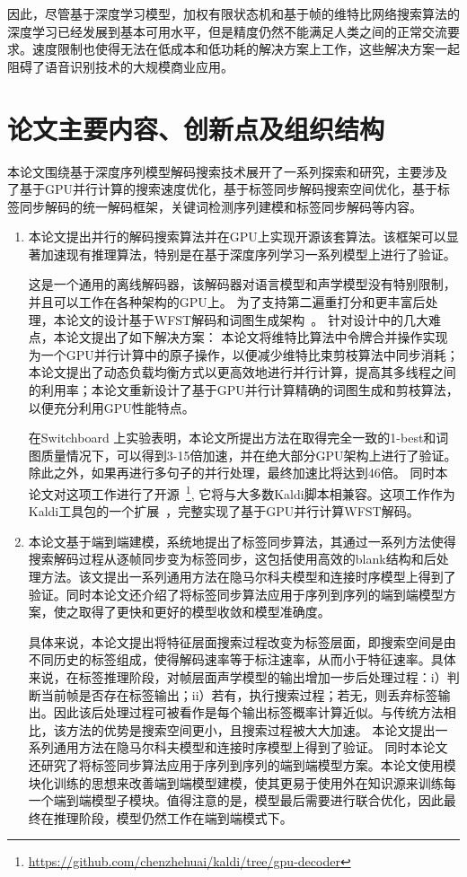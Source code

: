 因此，尽管基于深度学习模型，加权有限状态机和基于帧的维特比网络搜索算法的深度学习已经发展到基本可用水平，但是精度仍然不能满足人类之间的正常交流要求。速度限制也使得无法在低成本和低功耗的解决方案上工作，这些解决方案一起阻碍了语音识别技术的大规模商业应用。


\section{论文主要内容、创新点及组织结构}
\label{chap:intro0-thesis}
本论文围绕基于深度序列模型解码搜索技术展开了一系列探索和研究，主要涉及
了基于GPU并行计算的搜索速度优化，基于标签同步解码搜索空间优化，基于标签同步解码的统一解码框架，关键词检测序列建模和标签同步解码等内容。

\begin{enumerate}
    \item 
本论文提出并行的解码搜索算法并在GPU上实现开源该套算法。该框架可以显著加速现有推理算法，特别是在基于深度序列学习一系列模型上进行了验证。

这是一个通用的离线解码器，该解码器对语言模型和声学模型没有特别限制，并且可以工作在各种架构的GPU上。
为了支持第二遍重打分和更丰富后处理，本论文的设计基于WFST解码和词图生成架构~\cite{povey2012generating}。
针对设计中的几大难点，本论文提出了如下解决方案：
本论文将维特比算法中令牌合并操作实现为一个GPU并行计算中的原子操作，以便减少维特比束剪枝算法中同步消耗；本论文提出了动态负载均衡方式以更高效地进行并行计算，提高其多线程之间的利用率；本论文重新设计了基于GPU并行计算精确的词图生成和剪枝算法，以便充分利用GPU性能特点。

在Switchboard 上实验表明，本论文所提出方法在取得完全一致的1-best和词图质量情况下，可以得到3-15倍加速，并在绝大部分GPU架构上进行了验证。除此之外，如果再进行多句子的并行处理，最终加速比将达到46倍。
同时本论文对这项工作进行了开源~\footnote{\url{https://github.com/chenzhehuai/kaldi/tree/gpu-decoder}},
它将与大多数Kaldi脚本相兼容。这项工作作为Kaldi工具包的一个扩展~\cite{povey2011kaldi}，完整实现了基于GPU并行计算WFST解码。

\item 本论文基于端到端建模，系统地提出了标签同步算法，其通过一系列方法使得搜索解码过程从逐帧同步变为标签同步，这包括使用高效的blank结构和后处理方法。该文提出一系列通用方法在隐马尔科夫模型和连接时序模型上得到了验证。同时本论文还介绍了将标签同步算法应用于序列到序列的端到端模型方案，使之取得了更快和更好的模型收敛和模型准确度。

具体来说，本论文提出将特征层面搜索过程改变为标签层面，即搜索空间是由不同历史的标签组成，使得解码速率等于标注速率，从而小于特征速率。具体来说，在标签推理阶段，对帧层面声学模型的输出增加一步后处理过程：i）判断当前帧是否存在标签输出；ii）若有，执行搜索过程；若无，则丢弃标签输出。因此该后处理过程可被看作是每个输出标签概率计算近似。与传统方法相比，该方法的优势是搜索空间更小，且搜索过程被大大加速。
本论文提出一系列通用方法在隐马尔科夫模型和连接时序模型上得到了验证。
%
同时本论文还研究了将标签同步算法应用于序列到序列的端到端模型方案。本论文使用模块化训练的思想来改善端到端模型建模，使其更易于使用外在知识源来训练每一个端到端模型子模块。值得注意的是，模型最后需要进行联合优化，因此最终在推理阶段，模型仍然工作在端到端模式下。


\end{enumerate}
